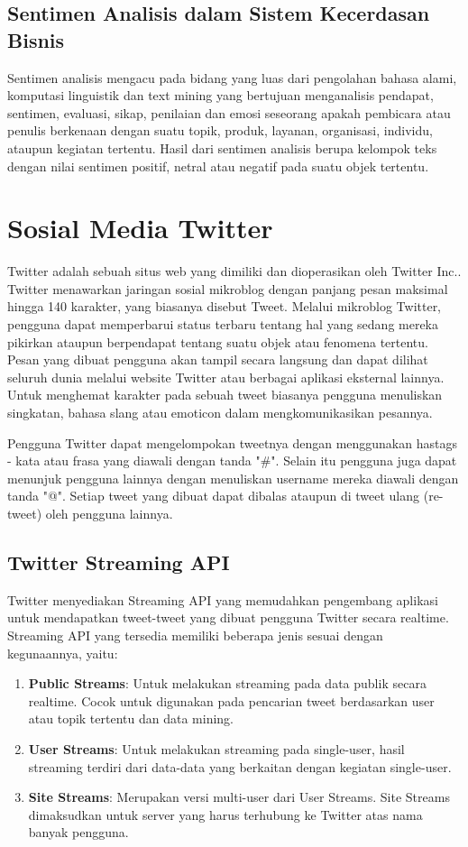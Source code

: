 \subsection{Sentimen Analisis dalam Sistem Kecerdasan Bisnis}
\label{sec:sentimen_analisis}
Sentimen analisis mengacu pada bidang yang luas dari pengolahan bahasa alami, komputasi linguistik dan text mining yang bertujuan menganalisis pendapat, sentimen, evaluasi, sikap, penilaian dan emosi seseorang apakah pembicara atau penulis berkenaan dengan suatu topik, produk, layanan, organisasi, individu, ataupun kegiatan tertentu. \cite{liu2012sentiment} Hasil dari sentimen analisis berupa kelompok teks dengan nilai sentimen positif, netral atau negatif pada suatu objek tertentu.

\section{Sosial Media Twitter}
\label{sec:twitter}
Twitter adalah sebuah situs web yang dimiliki dan dioperasikan oleh Twitter Inc.. Twitter menawarkan jaringan sosial mikroblog dengan panjang pesan maksimal hingga 140 karakter, yang biasanya disebut Tweet. Melalui mikroblog Twitter, pengguna dapat memperbarui status terbaru tentang hal yang sedang mereka pikirkan ataupun berpendapat tentang suatu objek atau fenomena tertentu. Pesan yang dibuat pengguna akan tampil secara langsung dan dapat dilihat seluruh dunia melalui website Twitter atau berbagai aplikasi eksternal lainnya. Untuk menghemat karakter pada sebuah tweet biasanya pengguna menuliskan singkatan, bahasa slang atau emoticon dalam mengkomunikasikan pesannya. 

Pengguna Twitter dapat mengelompokan tweetnya dengan menggunakan hastags - kata atau frasa yang diawali dengan tanda "\#". Selain itu pengguna juga dapat menunjuk pengguna lainnya dengan menuliskan username mereka diawali dengan tanda "@". Setiap tweet yang dibuat dapat dibalas ataupun di tweet ulang (re-tweet) oleh pengguna lainnya.

\subsection{Twitter Streaming API}
\label{sec:twitter_streaming_api}
Twitter menyediakan Streaming API yang memudahkan pengembang aplikasi untuk mendapatkan tweet-tweet yang dibuat pengguna Twitter secara realtime. Streaming API yang tersedia memiliki beberapa jenis sesuai dengan kegunaannya, yaitu:

\begin{enumerate}
	\item \textbf{Public Streams}: Untuk melakukan streaming pada data publik secara realtime. Cocok untuk digunakan pada pencarian tweet berdasarkan user atau topik tertentu dan data mining.
	\item \textbf{User Streams}: Untuk melakukan streaming pada single-user, hasil streaming terdiri dari data-data yang berkaitan dengan kegiatan single-user.
	\item	\textbf{Site Streams}: Merupakan versi multi-user dari User Streams. Site Streams dimaksudkan untuk server yang harus terhubung ke Twitter atas nama banyak pengguna.
\end{enumerate}

